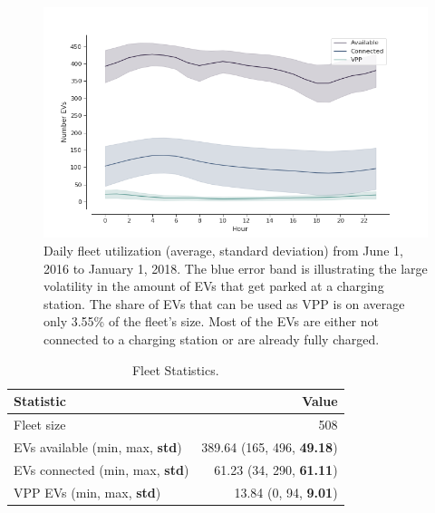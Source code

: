 \documentclass[a4paper, 12pt]{article}
\begin{document}
\begin{figure}[h]
\centering
\includegraphics[width=1\linewidth]{./fig/fleet-utilization.png}
\caption[Fleet Utilzation]{Daily fleet utilization (average, standard deviation) from June 1, 2016 to January 1, 2018. The blue error band is illustrating the large volatility in the amount of EVs that get parked at a charging station. The share of EVs that can be used as VPP is on average only 3.55\% of the fleet's size. Most of the EVs are either not connected to a charging station or are already fully charged. \label{fig-fleet-utilization}}
\end{figure}

\begin{table}[hp]
\caption[Fleet Statistics]{Fleet Statistics. \label{table-sim-stats}}
\centering
\begin{tabular}{lr}
\hline
\hline
Statistic & Value\\
\hline
Fleet size & 508\\
EVs available (min, max, \textbf{std}) & 389.64 (165, 496, \textbf{49.18})\\
EVs connected (min, max, \textbf{std}) & 61.23 (34, 290, \textbf{61.11})\\
VPP EVs (min, max, \textbf{std}) & 13.84 (0, 94, \textbf{9.01})\\
\hline
\hline
\end{tabular}
\end{table}
\end{document}
